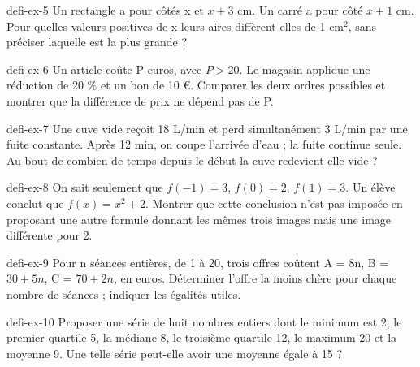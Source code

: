 \begin{blocEdition}{defi-ex-5}
Un rectangle a pour côtés x et $x+3$ cm. Un carré a pour côté $x+1$ cm. Pour quelles valeurs positives de x leurs aires diffèrent-elles de 1 cm$^2$, sans préciser laquelle est la plus grande ?
\end{blocEdition}
\begin{blocEdition}{defi-ex-6}
Un article coûte P euros, avec $P>20$. Le magasin applique une réduction de 20 \% et un bon de 10 €. Comparer les deux ordres possibles et montrer que la différence de prix ne dépend pas de P.
\end{blocEdition}
\begin{blocEdition}{defi-ex-7}
Une cuve vide reçoit 18 L/min et perd simultanément 3 L/min par une fuite constante. Après 12 min, on coupe l’arrivée d’eau ; la fuite continue seule. Au bout de combien de temps depuis le début la cuve redevient-elle vide ?
\end{blocEdition}
\begin{blocEdition}{defi-ex-8}
On sait seulement que $f(-1)=3$, $f(0)=2$, $f(1)=3$. Un élève conclut que $f(x)=x^2+2$. Montrer que cette conclusion n’est pas imposée en proposant une autre formule donnant les mêmes trois images mais une image différente pour 2.
\end{blocEdition}
\begin{blocEdition}{defi-ex-9}
Pour n séances entières, de 1 à 20, trois offres coûtent A = 8n, B = $30+5n$, C = $70+2n$, en euros. Déterminer l’offre la moins chère pour chaque nombre de séances ; indiquer les égalités utiles.
\end{blocEdition}
\begin{blocEdition}{defi-ex-10}
Proposer une série de huit nombres entiers dont le minimum est 2, le premier quartile 5, la médiane 8, le troisième quartile 12, le maximum 20 et la moyenne 9. Une telle série peut-elle avoir une moyenne égale à 15 ?
\end{blocEdition}
